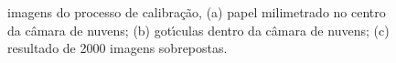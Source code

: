 \begin{figure}%
\centering
{} \qquad
{} \qquad
{}%
\centering \caption{ imagens do processo de calibra\c{c}\~{a}o, (a) papel milimetrado no centro da c\^{a}mara de nuvens; (b) got\'{\i}culas dentro da c\^{a}mara de nuvens; (c) resultado de 2000 imagens sobrepostas.}
\label{3figs}
\end{figure}

